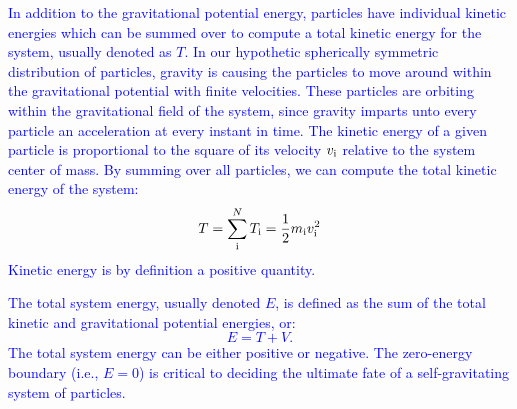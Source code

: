 \documentclass[main.tex]{subfiles}
\begin{document}
\begin{tcolorbox}[sharp corners, colback=blue!30, colframe=blue!80!blue, title=Kinetic Energy$^7$]
\par \textcolor{blue} {In addition to the gravitational potential energy, particles have individual kinetic energies which can be summed over to compute a total kinetic energy for the system, usually denoted as $T$.  In our hypothetic spherically symmetric distribution of particles, gravity is causing the particles to move around within the gravitational potential with finite velocities.  These particles are orbiting within the gravitational field of the system, since gravity imparts unto every particle an acceleration at every instant in time.  The kinetic energy of a given particle is proportional to the square of its velocity $v_{\rm i}$ relative to the system center of mass.  By summing over all particles, we can compute the total kinetic energy of the system:
\begin{equation}
T = \sum_{\rm i}^{N} T_{\rm i} = \frac{1}{2}m_{\rm i}v_{\rm i}^2
\end{equation}
Kinetic energy is by definition a positive quantity.}  
\end{tcolorbox}

\begin{tcolorbox}[sharp corners, colback=blue!30, colframe=blue!80!blue, title=Total Energy$^8$]
\par \textcolor{blue} {The total system energy, usually denoted $E$, is defined as the sum of the total kinetic and gravitational potential energies, or:
\begin{equation}
E = T + V.
\end{equation}
The total system energy can be either positive or negative.  The zero-energy boundary (i.e., $E = 0$) is critical to deciding the ultimate fate of a self-gravitating system of particles.}  
\end{tcolorbox}
\end{document}
